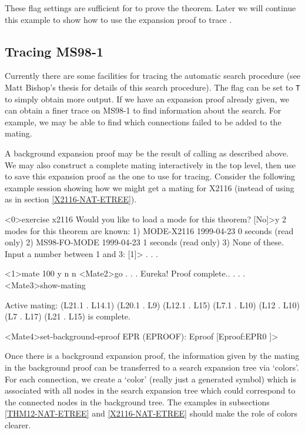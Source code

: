 These flag settings are sufficient for  to prove the
theorem.  Later we will continue this example to show how
to use the expansion proof to trace .

\subsection{Tracing MS98-1}\label{ms98-trace}

Currently there are some facilities for tracing the automatic search
procedure  (see Matt Bishop's thesis for details
of this search procedure).  The flag  can
be set to {\tt T} to simply obtain more output.  If we have an expansion
proof already given, we can obtain a finer trace on MS98-1 to find
information about the search.  For example, we may be able to find
which connections failed to be added to the mating.

A background expansion proof may be the result of calling
 as described above.
We may also construct a complete mating interactively
in the  top level, then use
 to save this expansion
proof as the one to use for tracing.  Consider the following
example session showing how we might get a mating
for X2116 (instead of using 
as in section \ref{X2116-NAT-ETREE}).

\begin{tpsexample}
<0>exercise x2116
Would you like to load a mode for this theorem? [No]>y
2 modes for this theorem are known:
1) MODE-X2116  1999-04-23  0 seconds  (read only)
2) MS98-FO-MODE  1999-04-23  1 seconds  (read only)
3) None of these.
Input a number between 1 and 3: [1]>
. . .

<1>mate 100 y n n
<Mate2>go
. . .
Eureka!  Proof complete..
. . .
<Mate3>show-mating

Active mating:
(L21.1 . L14.1)  (L20.1 . L9)  (L12.1 . L15)
(L7.1 . L10)  (L12 . L10)  (L7 . L17)
(L21 . L15)
is complete.

<Mate4>set-background-eproof
EPR (EPROOF): Eproof [Eproof:EPR0 ]>
\end{tpsexample}

Once there is a background expansion proof,
the information given by the mating in the background proof
can be transferred to a search expansion tree via `colors'.
For each connection, we create a `color' (really just
a generated symbol) which is associated with all nodes
in the search expansion tree which could correspond to the connected
nodes in the background tree.  The examples in subsections
\ref{THM12-NAT-ETREE} and \ref{X2116-NAT-ETREE}
should make the role of colors clearer.

